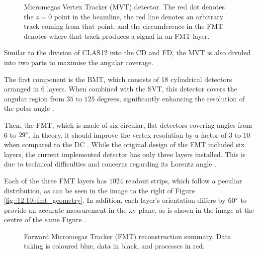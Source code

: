     \begin{figure}[b!]
        \caption[Micromegas Vertex Tracker (MVT) detector]
        {Micromegas Vertex Tracker (MVT) detector.
        The red dot denotes the $z=0$ point in the beamline, the red line denotes an arbitrary track coming from that point, and the circumference in the FMT denotes where that track produces a signal in an FMT layer.}
        \label{fig::12.10::micromegas_vertex_tracker}
    \end{figure}

    Similar to the division of CLAS12 into the CD and FD, the MVT is also divided into two parts to maximise the angular coverage.

    The first component is the BMT, which consists of 18 cylindrical detectors arranged in 6 layers.
    When combined with the SVT, this detector covers the angular region from $35$ to $125$ degrees, significantly enhancing the resolution of the polar angle \cite{acker2020mvt}.

    Then, the FMT, which is made of six circular, flat detectors covering angles from $6$ to $29\degree$.
    In theory, it should improve the vertex resolution by a factor of $3$ to $10$ when compared to the DC \cite{aune2009}.
    While the original design of the FMT included six layers, the current implemented detector has only three layers installed.
    This is due to technical difficulties and concerns regarding its Lorentz angle \cite{konczykowski2010}.

    Each of the three FMT layers has $1024$ readout strips, which follow a peculiar distribution, as can be seen in the image to the right of Figure \ref{fig::12.10::fmt_geometry}.
    In addition, each layer's orientation differs by $60\degree$ to provide an accurate measurement in the xy-plane, as is shown in the image at the centre of the same Figure \cite{acker2020mvt}.

    \begin{wrapfigure}{r}{0.50\textwidth}
        \caption[Forward Micromegas Tracker (FMT) reconstruction summary]
        {Forward Micromegas Tracker (FMT) reconstruction summary.
        Data taking is coloured blue, data in black, and processes in red.}
        \label{fig::12.11::fmt_reconstruction}
    \end{wrapfigure}

